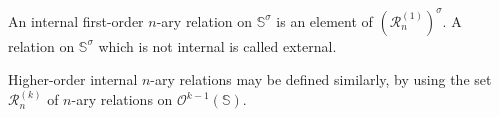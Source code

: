 An internal first-order $n$-ary relation on $\mathbb{S}^\sigma$ is an element of $(\mathcal{R}_n^{(1)})^\sigma$. A relation on $\mathbb{S}^\sigma$ which is not internal is called external.

Higher-order internal $n$-ary relations may be defined similarly, by using the set $\mathcal{R}_n^{(k)}$ of $n$-ary relations on $\mathcal{O}^{k-1}(\mathbb{S})$.
